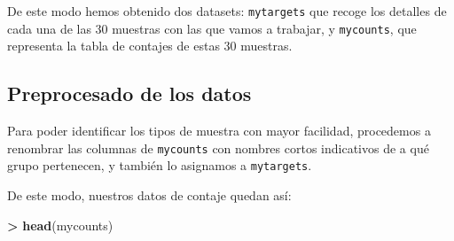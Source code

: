 \documentclass[
  english,
]{article}
\newenvironment{Shaded}{\begin{snugshade}}{\end{snugshade}}
\newcommand{\CommentTok}[1]{\textcolor[rgb]{0.56,0.35,0.01}{\textit{#1}}}
\newcommand{\DecValTok}[1]{\textcolor[rgb]{0.00,0.00,0.81}{#1}}
\newcommand{\ErrorTok}[1]{\textcolor[rgb]{0.64,0.00,0.00}{\textbf{#1}}}
\newcommand{\KeywordTok}[1]{\textcolor[rgb]{0.13,0.29,0.53}{\textbf{#1}}}
\newcommand{\NormalTok}[1]{#1}
\newcommand{\OperatorTok}[1]{\textcolor[rgb]{0.81,0.36,0.00}{\textbf{#1}}}
\newcommand{\StringTok}[1]{\textcolor[rgb]{0.31,0.60,0.02}{#1}}
\begin{document}
De este modo hemos obtenido dos datasets: \texttt{mytargets} que recoge
los detalles de cada una de las 30 muestras con las que vamos a
trabajar, y \texttt{mycounts}, que representa la tabla de contajes de
estas 30 muestras.

\hypertarget{preprocesado-de-los-datos}{%
\subsection{Preprocesado de los datos}\label{preprocesado-de-los-datos}}

Para poder identificar los tipos de muestra con mayor facilidad,
procedemos a renombrar las columnas de \texttt{mycounts} con nombres
cortos indicativos de a qué grupo pertenecen, y también lo asignamos a
\texttt{mytargets}.

\begin{Shaded}
\end{Shaded}

De este modo, nuestros datos de contaje quedan así:

\begin{Shaded}
\begin{Highlighting}[]
\OperatorTok{>}\StringTok{ }\KeywordTok{head}\NormalTok{(mycounts)}
\end{Highlighting}
\end{Shaded}
\end{document}
